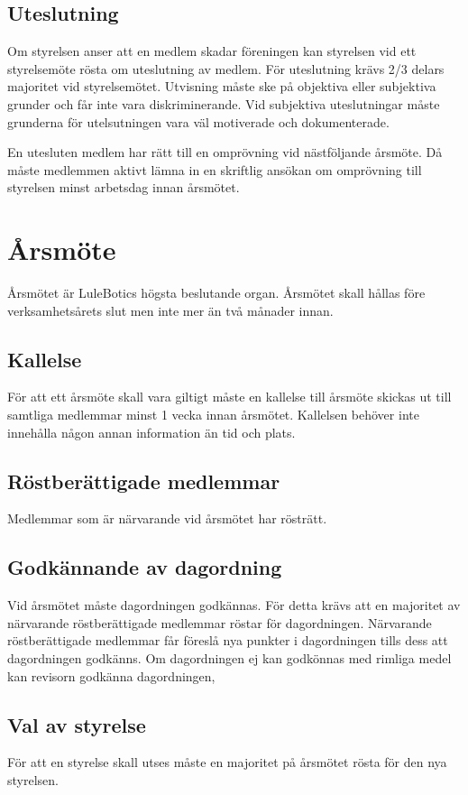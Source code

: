 \documentclass{article}
\begin{document}
\subsection{Uteslutning}
Om styrelsen anser att en medlem skadar föreningen kan styrelsen vid ett styrelsemöte rösta om uteslutning av medlem. För uteslutning krävs 2/3 delars majoritet vid styrelsemötet. Utvisning måste ske på objektiva eller subjektiva grunder och får inte vara diskriminerande. Vid subjektiva uteslutningar måste grunderna för utelsutningen vara väl motiverade och dokumenterade. 

En utesluten medlem har rätt till en omprövning vid nästföljande årsmöte. Då måste medlemmen aktivt lämna in en skriftlig ansökan om omprövning till styrelsen minst arbetsdag innan årsmötet.


\section{Årsmöte}
Årsmötet är LuleBotics högsta beslutande organ.
Årsmötet skall hållas före verksamhetsårets slut men inte mer än två månader innan.
\subsection{Kallelse}
För att ett årsmöte skall vara giltigt måste en kallelse till årsmöte skickas ut till samtliga medlemmar minst 1 vecka innan årsmötet. Kallelsen behöver inte innehålla någon annan information än tid och plats.
\subsection{Röstberättigade medlemmar}
Medlemmar som är närvarande vid årsmötet har rösträtt.

\subsection{Godkännande av dagordning}
Vid årsmötet måste dagordningen godkännas. För detta krävs att en majoritet av närvarande röstberättigade medlemmar röstar för dagordningen. Närvarande röstberättigade medlemmar får föreslå nya punkter i dagordningen tills dess att dagordningen godkänns. Om dagordningen ej kan godkönnas med rimliga medel kan revisorn godkänna dagordningen,

\subsection{Val av styrelse}
För att en styrelse skall utses måste en majoritet på årsmötet rösta för den nya styrelsen.
\end{document}
